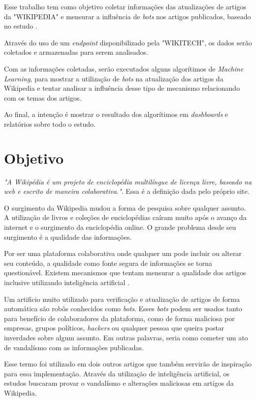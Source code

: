 \documentclass[a4paper, 12pt]{article}
\begin{document}
Esse trabalho tem como objetivo coletar informações das atualizações de artigos da "WIKIPEDIA"\cite{Wiki} e mensurar a influência de \textit{bots} nos artigos publicados, baseado no estudo \cite{art3}.

Através do uso de um \textit{endpoint} disponibilizado pela "WIKITECH"\cite{Wikitech}, os dados serão coletados e armazenadas para serem analisados.

Com as informações coletadas, serão executados alguns algorítimos de \textit{Machine Learning}, para mostrar a utilização de \textit{bots} na atualização dos artigos da Wikipedia e tentar analisar a influência desse tipo de mecanismo relacionando com os temas dos artigos.

Ao final, a intenção é mostrar o resultado dos algorítimos em \textit{dashboards} e relatórios sobre todo o estudo.

\newpage

\section{Objetivo}

\textit{"A Wikipédia é um projeto de enciclopédia multilíngue de licença livre, baseado na web e escrito de maneira colaborativa."}.
Essa é a definição dada pelo próprio site\cite{Wiki}.

O surgimento da Wikipedia mudou a forma de pesquisa sobre qualquer assunto. A utilização de livros e coleções de enciclopédias caíram muito após o avanço da internet e o surgimento da enciclopédia online. O grande problema desde seu surgimento é a qualidade das informações.

Por ser uma plataforma colaborativa onde qualquer um pode incluir ou alterar seu conteúdo, a qualidade como fonte segura de informações se torna questionável. Existem mecanismos que tentam mensurar a qualidade dos artigos \cite{art1} inclusive utilizando inteligência artificial \cite{art2}.

Um artificio muito utilizado para verificação e atualização de artigos de forma automática são robôs conhecidos como \textit{bots}. Esses \textit{bots} podem ser usados tanto para benefício de colaboradores da plataforma, como de forma maliciosa por empresas, grupos políticos, \textit{hackers} ou qualquer pessoa que queira postar inverdades sobre algum assunto. Em outras palavras, seria como cometer um ato de vandalísmo com as informações publicadas.

Esse termo foi utilizado em dois outros artigos que também servirão de inspiração para essa implementação\cite{art4}\cite{art5}. Através da utilização de inteligência artificial, os estudos buscaram provar o vandalísmo e alterações maliciosas em artigos da Wikipedia.
\end{document}
